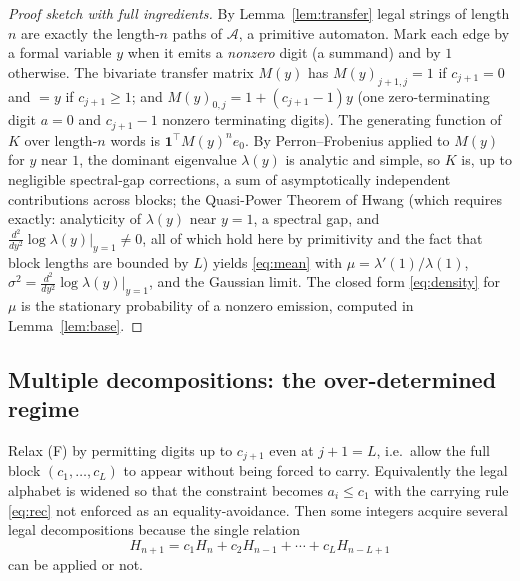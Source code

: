 \documentclass[12pt]{article}
\theoremstyle{definition}
\begin{document}
\begin{proof}[Proof sketch with full ingredients]
By Lemma~\ref{lem:transfer} legal strings of length $n$ are exactly the
length-$n$ paths of $\mathcal A$, a primitive automaton. Mark each edge by a
formal variable $y$ when it emits a \emph{nonzero} digit (a summand) and by $1$
otherwise. The bivariate transfer matrix $M(y)$ has $M(y)_{j+1,j}=1$ if
$c_{j+1}=0$ and $=y$ if $c_{j+1}\ge1$; and
$M(y)_{0,j}=1+(c_{j+1}-1)y$ (one zero-terminating digit $a=0$ and
$c_{j+1}-1$ nonzero terminating digits). The generating function of $K$ over
length-$n$ words is $\mathbf 1^{\!\top}M(y)^n e_0$. By Perron--Frobenius applied
to $M(y)$ for $y$ near $1$, the dominant eigenvalue $\lambda(y)$ is analytic and
simple, so $K$ is, up to negligible spectral-gap corrections, a sum of
asymptotically independent contributions across blocks; the Quasi-Power Theorem
of Hwang (which requires exactly: analyticity of $\lambda(y)$ near $y=1$, a
spectral gap, and $\frac{d^2}{dy^2}\log\lambda(y)|_{y=1}\neq0$, all of which hold
here by primitivity and the fact that block lengths are bounded by $L$) yields
\eqref{eq:mean} with
$\mu=\lambda'(1)/\lambda(1)$, $\sigma^2=\frac{d^2}{dy^2}\log\lambda(y)|_{y=1}$,
and the Gaussian limit. The closed form \eqref{eq:density} for $\mu$ is the
stationary probability of a nonzero emission, computed in
Lemma~\ref{lem:base}.
\end{proof}

\subsection{Multiple decompositions: the over-determined regime}
Relax (F) by permitting digits up to $c_{j+1}$ even at $j+1=L$, i.e.\ allow the
full block $(c_1,\dots,c_L)$ to appear without being forced to carry. Equivalently
the legal alphabet is widened so that the constraint becomes
$a_i\le c_1$ with the carrying rule \eqref{eq:rec} not enforced as an
equality-avoidance. Then some integers acquire several legal decompositions
because the single relation
\begin{equation}\label{eq:relation}
H_{n+1}=c_1H_n+c_2H_{n-1}+\cdots+c_LH_{n-L+1}
\end{equation}
can be applied or not.
\end{document}
